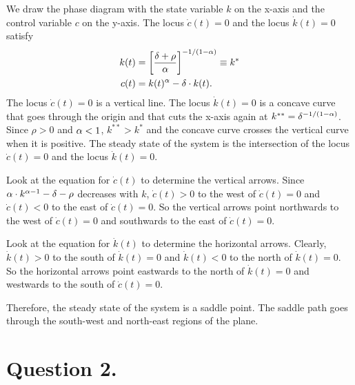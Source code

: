 \documentclass[letterpaper,12pt,leqno]{article}
\begin{document}
\begin{enumerate}
We draw the phase diagram with the state variable $k$ on the x-axis
and the control variable $c$ on the y-axis. The locus $\dot{c}(t)=0$ and the locus $\dot{k}(t)=0$ satisfy
\begin{align*}
k(t)&=\left[\frac{\delta +\rho}{\alpha}\right]^{-1/(1-\alpha)}\equiv k^{*}\\
c(t)&=k(t)^{\alpha}-\delta\cdot k(t).
\end{align*}
The locus  $\dot{c}(t)=0$ is a vertical line. The locus $\dot{k}(t)=0$ is a concave curve that goes through the origin and that cuts the x-axis again at $k^{**}=\delta^{-1/(1-\alpha)}$. Since $\rho>0$ and $\alpha<1$, $k^{**}>k^{*}$ and the concave curve crosses the vertical curve when it is positive. The steady state of the system is the intersection of the locus  $\dot{c}(t)=0$  and the locus $\dot{k}(t)=0$.

Look at the equation for $\dot{c}(t)$ to determine the vertical arrows. Since $\alpha\cdot k^{\alpha-1}-\delta -\rho$ decreases with $k$, $\dot{c}(t)>0$ to the west of $\dot{c}(t)=0$  and $\dot{c}(t)<0$  to the east of $\dot{c}(t)=0$. So the vertical arrows point northwards to the west of $\dot{c}(t)=0$ and southwards to the east of $\dot{c}(t)=0$. 

Look at the equation for $\dot{k}(t)$ to determine the horizontal arrows. Clearly, $\dot{k}(t)>0$ to the south of $\dot{k}(t)=0$ and $\dot{k}(t)<0$ to the north of $\dot{k}(t)=0$. So the horizontal arrows point eastwards to the north of $\dot{k}(t)=0$ and westwards to the south of $\dot{c}(t)=0$. 

Therefore, the steady state of the system is a saddle point. The saddle path goes through the south-west and north-east regions of the plane. 

\end{enumerate}


\section*{Question 2.} 
\end{document}
